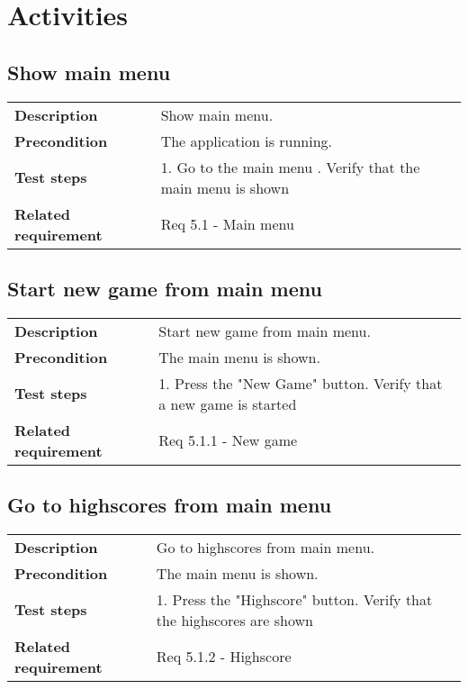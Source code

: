 \documentclass[a4paper,titlepage]{article}
\begin{document}
\newpage
\section{Activities}
\subsection{Show main menu}
\begin{tabularx}{\textwidth}{lX}
	\textbf{Description}	&
		Show main menu.\\
	\textbf{Precondition}	&
		The application is running.\\
	\textbf{Test steps}	&
		1. Go to the main menu \newline
		2. Verify that the main menu is shown \\
	\textbf{Related requirement}	&
		Req 5.1 - Main menu \\
\end{tabularx}

\subsection{Start new game from main menu}
\begin{tabularx}{\textwidth}{lX}
	\textbf{Description}	&
		Start new game from main menu.\\
	\textbf{Precondition}	&
		The main menu is shown.\\
	\textbf{Test steps}	&
		1. Press the "New Game" button\newline
		2. Verify that a new game is started\\
	\textbf{Related requirement}	&
		Req 5.1.1 - New game \\
\end{tabularx}

\subsection{Go to highscores from main menu}
\begin{tabularx}{\textwidth}{lX}
	\textbf{Description}	&
		Go to highscores from main menu.\\
	\textbf{Precondition}	&
		The main menu is shown.\\
	\textbf{Test steps}	&
		1. Press the "Highscore" button\newline
		2. Verify that the highscores are shown\\
	\textbf{Related requirement}	&
		Req 5.1.2 - Highscore \\
\end{tabularx}
\end{document}
